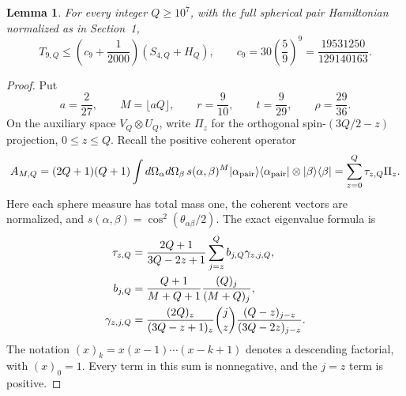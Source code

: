\documentclass[11pt]{article}
\newtheorem{lemma}{Lemma}
\begin{document}
\begin{lemma}\label{lem:explicit-tail}
For every integer $Q\ge10^7$, with the full spherical pair Hamiltonian
normalized as in Section~1,
\begin{equation}\label{eq:explicit-tail-result}
 T_{9,Q}\le\left(c_9+\frac1{2000}\right)(S_{4,Q}+H_Q),
 \qquad c_9=30\left(\frac59\right)^9
             =\frac{19531250}{129140163}.
\end{equation}
\end{lemma}
\begin{proof}
Put
\begin{equation}\label{eq:explicit-tail-parameters}
 a=\frac2{27},\qquad M=\lfloor aQ\rfloor,\qquad
 r=\frac9{10},\qquad t=\frac9{29},\qquad \rho=\frac{29}{36}.
\end{equation}
On the auxiliary space $V_Q\otimes U_Q$, write $\Pi_z$ for the
orthogonal spin-$(3Q/2-z)$ projection, $0\le z\le Q$. Recall the positive
coherent operator
\begin{equation}
 A_{M,Q}=(2Q+1)(Q+1)\int d\Omega_\alpha d\Omega_\beta\,
 s(\alpha,\beta)^M
 |\alpha_{\rm pair}\rangle\langle\alpha_{\rm pair}|
 \otimes|\beta\rangle\langle\beta|
 =\sum_{z=0}^Q\tau_{z,Q}\Pi_z.
\end{equation}
Here each sphere measure has total mass one, the coherent vectors are
normalized, and $s(\alpha,\beta)=\cos^2(\theta_{\alpha\beta}/2)$.
The exact eigenvalue formula is
\begin{align}
 \tau_{z,Q}&=\frac{2Q+1}{3Q-2z+1}
       \sum_{j=z}^Q b_{j,Q}\gamma_{z,j,Q},\label{eq:explicit-tail-tau}\\
 b_{j,Q}&=\frac{Q+1}{M+Q+1}\frac{(Q)_j}{(M+Q)_j},\notag\\
 \gamma_{z,j,Q}&=\frac{(2Q)_z}{(3Q-z+1)_z}
       \binom jz\frac{(Q-z)_{j-z}}{(3Q-2z)_{j-z}}.\notag
\end{align}
The notation $(x)_k=x(x-1)\cdots(x-k+1)$ denotes a descending factorial,
with $(x)_0=1$. Every term in this sum is nonnegative, and the $j=z$
term is positive.


\end{proof}
\end{document}
